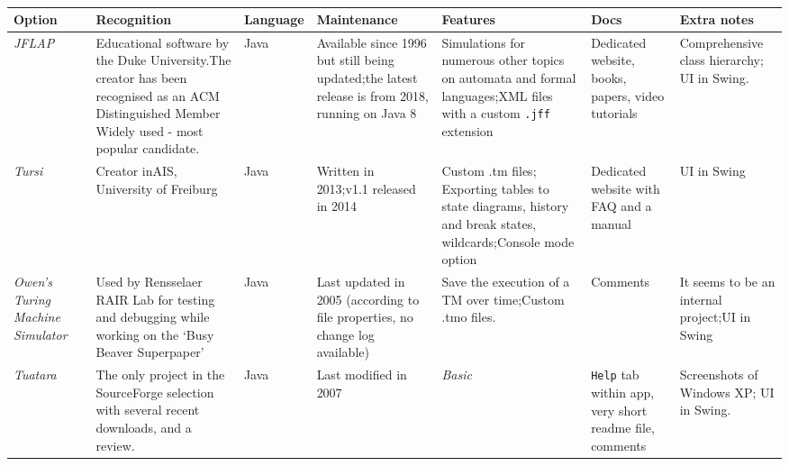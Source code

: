 \documentclass[12pt]{article}
\begin{document}
		\clearpage\begin{table}[h!]
			\centering
			\caption{}
			\label{table:open-source} 
			\scriptsize
			\begin{tabular}{|m{0.8in} |m{1in}|m{0.5in}|m{0.8in}|m{0.8in}|m{0.6in}|m{0.8in}|}
				\hline
				\textbf{Option} & \textbf{Recognition} & \textbf{Language} & \textbf{Maintenance} & \textbf{Features} & \textbf{Docs} & \textbf{Extra notes} \\ \hline
				\textit{JFLAP}~\cite{rodger2006jflap} 
					& Educational software by the Duke University.\newline The creator has been recognised as an ACM Distinguished Member \newline Widely used - most popular candidate.
					& Java 
					& Available since 1996 but still being updated;\newline the latest release is from 2018, running on Java 8  
					& Simulations for numerous other topics on automata and formal languages;\newline XML files with a custom \texttt{.jff} extension 
					& Dedicated website, books, papers, video tutorials 
					& Comprehensive class hierarchy; UI in Swing. \\ \hline
				\textit{Tursi}~\cite{schätzle_2014} 
					& Creator in\newline AIS, University of Freiburg & Java &  Written in 2013;\newpage v1.1 released in 2014 
					& Custom .tm files; Exporting tables to state diagrams, history and break states, wildcards;\newline Console mode option & Dedicated website with FAQ and a manual  & UI in Swing \\ \hline
				\textit{Owen's Turing Machine Simulator}~\cite{kellett} 
					& Used by Rensselaer RAIR Lab for testing and debugging while working on the `Busy Beaver Superpaper'~\cite{rossnew}
					& Java & Last updated in 2005 (according to file properties, no change log available)  & Save the execution of a TM over time;\newline Custom .tmo files. & Comments & It seems to be an internal project;\newline UI in Swing \\ \hline
				\textit{Tuatara}~\cite{satyr9_timestokes_2007} 
					& The only project in the SourceForge selection with several recent downloads, and a review. & Java & Last modified in 2007  & \textit{Basic} & \texttt{Help} tab within app, very short readme file, comments & Screenshots of Windows XP; UI in Swing.  \\ \hline

\end{tabular}
\end{table}
\end{document}
